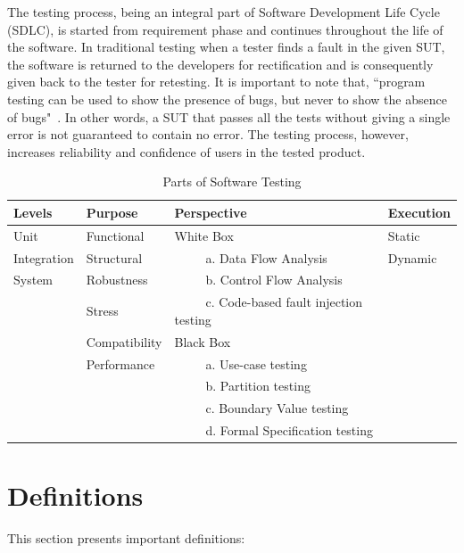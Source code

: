 The testing process, being an integral part of Software Development Life Cycle (SDLC), is started from requirement phase and continues throughout the life of the software. In traditional testing when a tester finds a fault in the given SUT, the software is returned to the developers for rectification and is consequently given back to the tester for retesting. It is important to note that, ``program testing can be used to show the presence of bugs, but never to show the absence of bugs"~\cite{Dijkstra1972}. In other words, a SUT that passes all the tests without giving a single error is not guaranteed to contain no error. The testing process, however, increases reliability and confidence of users in the tested product. \\


\begin{table}[ht]
\caption{Parts of Software Testing} %
\bigskip
\centering %
{\renewcommand{\arraystretch}{1.5} %
\begin{tabular}{| l | l | l | l | } %
\hline

Levels 					&Purpose		 		& Perspective							& Execution 	\\
\hline
Unit						& Functional			& White Box							& Static 		\\
Integration				& Structural			& ~~~~~a. Data Flow Analysis				& Dynamic	\\
System					& Robustness			& ~~~~~b. Control Flow Analysis			&			\\
						& Stress				& ~~~~~c. Code-based fault injection testing 	&			\\
						& Compatibility			& Black Box							&			\\
						& Performance			& ~~~~~a. Use-case testing				&			\\
						&					& ~~~~~b. Partition testing				&			\\
						&					& ~~~~~c. Boundary Value testing			&			\\
						&					& ~~~~~d. Formal Specification testing		&			\\



\hline %
\end{tabular}
}
\bigskip
\label{table:softwareTestingParts} %
\end{table}

\section{Definitions}
This section presents important definitions:

